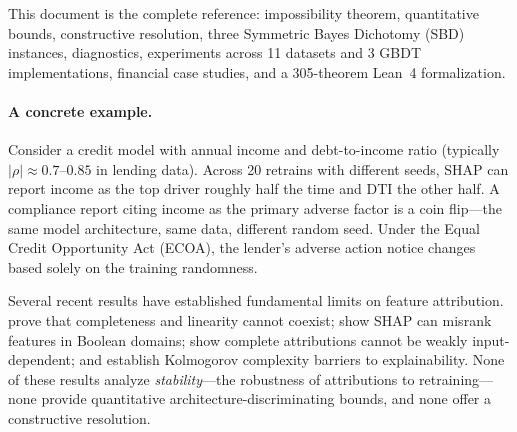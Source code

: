 \documentclass{article}
\begin{document}
This document is the complete reference: impossibility theorem, quantitative bounds, constructive resolution, three Symmetric Bayes Dichotomy (SBD) instances, diagnostics, experiments across 11 datasets and 3 GBDT implementations, financial case studies, and a 305-theorem Lean~4 formalization.

\paragraph{A concrete example.}
Consider a credit model with annual income and debt-to-income ratio
(typically $|\rho| \approx 0.7$--$0.85$ in lending data). Across 20 retrains with different seeds, SHAP
can report income as the top driver roughly half the time and DTI the other half.
A compliance report citing income as the primary adverse factor
is a coin flip---the same model architecture, same data, different
random seed. Under the Equal Credit Opportunity Act (ECOA), the lender's adverse action notice
changes based solely on the training randomness.

\begin{sloppypar}
Several recent results have established fundamental limits on feature attribution.
\citet{bilodeau2024impossibility} prove that completeness and linearity cannot coexist;
\citet{huang2024failings} show SHAP can misrank features in Boolean domains;
\citet{srinivas2019full} show complete attributions cannot be weakly input-dependent;
and \citet{rao2025limits} establish Kolmogorov complexity barriers to explainability.
None of these results analyze \emph{stability}---the robustness of attributions to
retraining---none provide quantitative architecture-discriminating bounds, and none
offer a constructive resolution.
\end{sloppypar}
\end{document}
